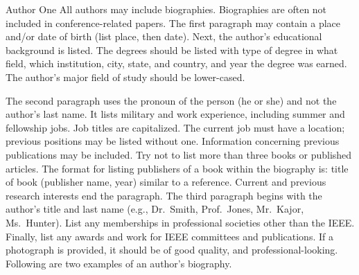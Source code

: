 
\begin{IEEEbiography}{Author One} All authors may include 
biographies. Biographies are often not included in conference-related
papers. The first paragraph may contain a place and/or date of birth (list place, then date). Next,
the author's educational background is listed. The degrees should be
listed with type of degree in what field, which institution, city,
state, and country, and year the degree was earned. The author's major
field of study should be lower-cased. 

The second paragraph uses the pronoun of the person (he or she) and not the 
author's last name. It lists military and work experience, including summer 
and fellowship jobs. Job titles are capitalized. The current job must have a 
location; previous positions may be listed 
without one. Information concerning previous publications may be included. 
Try not to list more than three books or published articles. The format for 
listing publishers of a book within the biography is: title of book 
(publisher name, year) similar to a reference. Current and previous research 
interests end the paragraph. The third paragraph begins with the author's 
title and last name (e.g., Dr.\ Smith, Prof.\ Jones, Mr.\ Kajor, Ms.\ Hunter). 
List any memberships in professional societies other than the IEEE. Finally, 
list any awards and work for IEEE committees and publications. If a 
photograph is provided, it should be of good quality, and 
professional-looking. Following are two examples of an author's biography.
\end{IEEEbiography}

